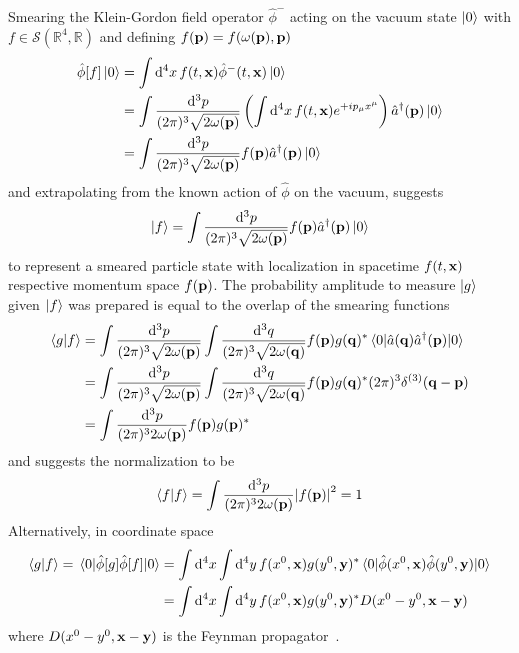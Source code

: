 Smearing the Klein-Gordon field operator $\hat\phi^-$ acting on the vacuum state $\ket{0}$ with $f\in\mathcal{S}(\mathbb{R}^4,\mathbb{R})$ and defining $f(\vb{p})=f(\omega(\vb{p}),\vb{p})$
\begin{align}
	\hat\phi[f]
	\ket{0}
	&=
	\int\dd[4]{x}
	f(t,\vb{x})
	\hat\phi^-(t,\vb{x})
	\ket{0}
	\\
	&=
	\int\frac{\dd[3]{p}}{(2\pi)^3\sqrt{2\omega(\vb{p})}}
	\left(
		\int\dd[4]{x}
		f(t,\vb{x})
		e^{+ip_\mu x^\mu}
	\right)
	\hat{a}^\dagger(\vb{p})
	\ket{0}
	\\
	&=
	\int\frac{\dd[3]{p}}{(2\pi)^3\sqrt{2\omega(\vb{p})}}
	f(\vb{p})
	\hat{a}^\dagger(\vb{p})
	\ket{0}
\end{align}
and extrapolating from the known action of $\hat\phi$ on the vacuum, suggests
\begin{equation}
	\ket{f}
	=
	\int\frac{\dd[3]{p}}{(2\pi)^3\sqrt{2\omega(\vb{p})}}
	f(\vb{p})
	\hat{a}^\dagger(\vb{p})
	\ket{0}
\end{equation}
to represent a smeared particle state with localization in spacetime $f(t,\vb{x})$ respective momentum space $f(\vb{p})$.
The probability amplitude to measure $\ket{g}$ given $\ket{f}$ was prepared is equal to the overlap of the smearing functions
\begin{equation}
	\begin{split}
		\bra{g}\ket{f}
		&=
		\int\frac{\dd[3]{p}}{(2\pi)^3\sqrt{2\omega(\vb{p})}}
		\int\frac{\dd[3]{q}}{(2\pi)^3\sqrt{2\omega(\vb{q})}}
		f(\vb{p})g(\vb{q})^*
		\expval{\hat{a}(\vb{q})\hat{a}^\dagger(\vb{p})}{0}
		\\
		&=
		\int\frac{\dd[3]{p}}{(2\pi)^3\sqrt{2\omega(\vb{p})}}
		\int\frac{\dd[3]{q}}{(2\pi)^3\sqrt{2\omega(\vb{q})}}
		f(\vb{p})g(\vb{q})^*
		(2\pi)^3\delta^{(3)}(\vb{q}-\vb{p})
		\\
		&=
		\int\frac{\dd[3]{p}}{(2\pi)^32\omega(\vb{p})}
		f(\vb{p})g(\vb{p})^*
	\end{split}
\end{equation}
and suggests the normalization to be
\begin{equation}
	\bra{f}\ket{f}
	=
	\int\frac{\dd[3]{p}}{(2\pi)^32\omega(\vb{p})}
	\abs{f(\vb{p})}^2
	=
	1
\end{equation}
Alternatively, in coordinate space
\begin{equation}
	\begin{split}
		\bra{g}\ket{f}
		=
		\expval{\hat\phi[g]\hat\phi[f]}{0}
		&=
		\int\dd[4]{x}
		\int\dd[4]{y}
		f(x^0,\vb{x})g(y^0,\vb{y})^*
		\expval{\hat\phi(x^0,\vb{x})\hat\phi(y^0,\vb{y})}{0}
		\\
		&=
		\int\dd[4]{x}
		\int\dd[4]{y}
		f(x^0,\vb{x})g(y^0,\vb{y})^*
		D(x^0-y^0,\vb{x}-\vb{y})
	\end{split}
\end{equation}
where $D(x^0-y^0,\vb{x}-\vb{y})$ is the Feynman propagator~\cite[p.~27]{Peskin1995}.

